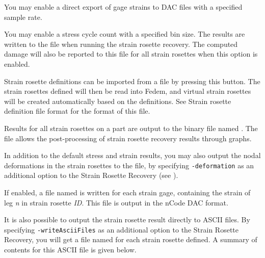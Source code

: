 {\begin{bulletlist}
  \setcounter{enumi}{1}
\item You may enable
  a direct export of gage strains to DAC files with a specified sample rate.
\item You may enable
  a stress cycle count with a specified bin size. The results are written to
  the file  when running the strain rosette recovery.
  The computed damage will also be reported to this file for all
  strain rosettes when this option is enabled.
\item Strain rosette definitions can be imported from a file by pressing this
  button. The strain rosettes defined will then be read into Fedem, and virtual
  strain rosettes will be created automatically based on the definitions. See
             {Strain rosette definition file format}
  for the format of this file.
\end{bulletlist}






Results for all strain rosettes on a part are output to the binary 
file named .
The  file allows the post-processing of strain rosette recovery
results through graphs.

In addition to the default stress and strain results, you may also output the
nodal deformations in the strain rosettes to the  file, by specifying
{\tt-deformation} as an additional option to the Strain Rosette Recovery
(see ).

If enabled, a file named  is written
for each strain gage, containing the strain of leg {\sl n} in strain rosette
{\sl ID}. This file is output in the nCode DAC format.

It is also possible to output the strain rosette result directly to ASCII files.
By specifying {\tt-writeAsciiFiles} as an additional option to the
Strain Rosette Recovery, you will get a file named
 for each strain rosette defined.
A summary of contents for this ASCII file is given below.

}
